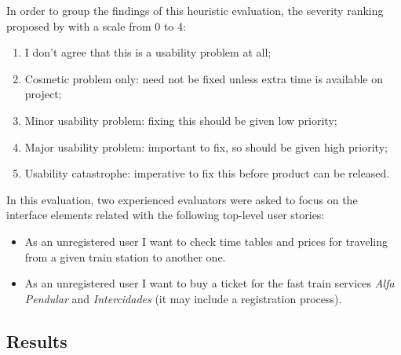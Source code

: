 \documentclass[a4paper]{article}
\begin{document}
In order to group the findings of this heuristic evaluation, the severity ranking proposed by \citet{nielsen1995rating} with a scale from 0 to 4:

\begin{enumerate}[start=0, label={\theenumi{} -}]
\item I don't agree that this is a usability problem at all;
\item Cosmetic problem only: need not be fixed unless extra time is available on project;
\item Minor usability problem: fixing this should be given low priority;
\item Major usability problem: important to fix, so should be given high priority;
\item Usability catastrophe: imperative to fix this before product can be released.
\end{enumerate}

In this evaluation, two experienced evaluators were asked to focus on the interface elements related with the following top-level user stories:
\begin{itemize}
  \item As an unregistered user I want to check time tables and prices for traveling from a given train station to another one.
  \item As an unregistered user I want to buy a ticket for the fast train services \textit{Alfa Pendular} and \textit{Intercidades} (it may include a registration process).
\end{itemize}

\subsection{Results}
\end{document}
